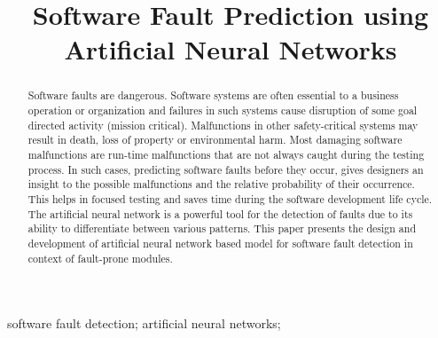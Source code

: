 \documentclass[10pt, conference, compsocconf]{IEEEtran}
\begin{document}
\title{Software Fault Prediction using Artificial Neural Networks}

\author{
  \and
  \and
}
\maketitle

\begin{abstract}
  Software faults are dangerous. Software systems are often essential to a business operation or organization and failures in such systems cause disruption of some goal directed activity (mission critical). Malfunctions in other safety-critical systems may result in death, loss of property or environmental harm. Most damaging software malfunctions are run-time malfunctions that are not always caught during the testing process. In such cases, predicting software faults before they occur, gives designers an insight to the possible malfunctions and the relative probability of their occurrence. This helps in focused testing and saves time during the software development life cycle. The artificial neural network is a powerful tool for the detection of faults due to its ability to differentiate between various patterns. This paper presents the design and development of artificial neural network based model for software fault detection in context of fault-prone modules.
\end{abstract}

\begin{IEEEkeywords}
  software fault detection; artificial neural networks;
\end{IEEEkeywords}

\IEEEpeerreviewmaketitle
\end{document}
